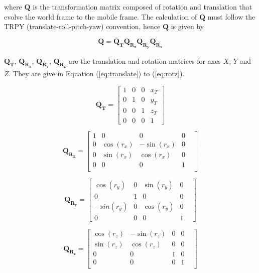\noindent where $\boldsymbol{Q}$ is the transformation matrix composed
of rotation and translation that evolve the world frame to the mobile frame. The
calculation of $\boldsymbol{Q}$ must follow the TRPY (translate-roll-pitch-yaw)
convention, hence $\boldsymbol{Q}$ is given by

\begin{equation}
\boldsymbol{Q}= \boldsymbol{Q_TQ_{R_z}Q_{R_y}Q_{R_x}}
\end{equation}

$\boldsymbol{Q_T}$, $\boldsymbol{Q_{R_x}}$, $\boldsymbol{Q_{R_y}}$,
$\boldsymbol{Q_{R_z}}$ are the translation and rotation matrices for axes
$X$, $Y$ and $Z$. They are give in Equation (\ref{eq:translate}) to
(\ref{eq:rotz}).

\begin{equation}
\label{eq:translate}
\boldsymbol{Q_T} = \begin{bmatrix}
1 & 0 & 0 & x_T \\
0 & 1 & 0 & y_T \\
0 & 0 & 1 & z_T \\
0 & 0 & 0 & 1 \end{bmatrix}
\end{equation}

\begin{equation}
\label{eq:rotx}
\boldsymbol{Q_{R_x}}= \begin{bmatrix}
1 & 0 & 0 & 0 & \\
0 & \cos (r_{x}) & -\sin (r_{x}) & 0 & \\
0 & \sin (r_{x}) & \cos (r_{x}) & 0 & \\
0 & 0 & 0 & 1 & \\
\end{bmatrix}
\end{equation}


\begin{equation}
\label{eq:roty}
\boldsymbol{Q_{R_y}}= \begin{bmatrix}
\cos (r_{y}) & 0 & \sin (r_{y}) & 0 & \\
0 & 1 & 0 & 0 & \\
-sin(r_{y}) & 0 & \cos (r_{y}) & 0 & \\
0 & 0 & 0 & 1 & 
\end{bmatrix}
\end{equation}


\begin{equation}
\label{eq:rotz}
\boldsymbol{Q_{R_z}}=\begin{bmatrix}
\cos (r_{z}) & -\sin (r_{z}) & 0 & 0 & \\
\sin (r_{z}) & \cos (r_{z}) & 0 & 0 & \\
0 & 0 & 1 & 0 & \\
0 & 0 & 0 & 1 & \\
\end{bmatrix}
\end{equation}

